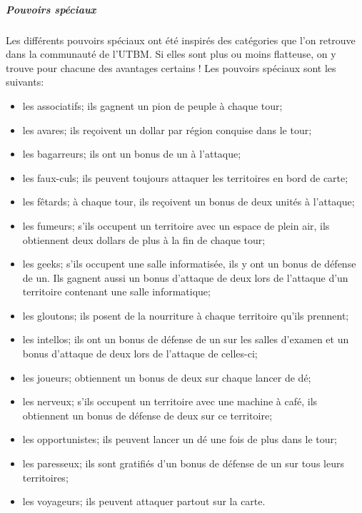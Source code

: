 \documentclass[a4paper, 11pt]{article}
\begin{document}
		\subparagraph{Pouvoirs spéciaux}
		Les différents pouvoirs spéciaux ont été inspirés des catégories que l'on retrouve dans la communauté de l'UTBM. Si elles sont plus ou moins flatteuse, on y trouve pour chacune des avantages certains ! Les pouvoirs spéciaux sont les suivants:
		\begin{itemize}
			\item les associatifs; ils gagnent un pion de peuple à chaque tour;
			\item les avares; ils reçoivent un dollar par région conquise dans le tour;
			\item les bagarreurs; ils ont un bonus de un à l'attaque;
			\item les faux-culs; ils peuvent toujours attaquer les territoires en bord de carte;
			\item les fêtards; à chaque tour, ils reçoivent un bonus de deux unités à l'attaque;
			\item les fumeurs; s'ils occupent un territoire avec un espace de plein air, ils obtiennent deux dollars de plus à la fin de chaque tour;
			\item les geeks; s'ils occupent une salle informatisée, ils y ont un bonus de défense de un. Ils gagnent aussi un bonus d'attaque de deux lors de l'attaque d'un territoire contenant une salle informatique;
			\item les gloutons; ils posent de la nourriture à chaque territoire qu'ils prennent;
			\item les intellos; ils ont un bonus de défense de un sur les salles d'examen et un bonus d'attaque de deux lors de l'attaque de celles-ci;
			\item les joueurs; obtiennent un bonus de deux sur chaque lancer de dé;
			\item les nerveux; s'ils occupent un territoire avec une machine à café, ils obtiennent un bonus de défense de deux sur ce territoire;
			\item les opportunistes; ils peuvent lancer un dé une fois de plus dans le tour;
			\item les paresseux; ils sont gratifiés d'un bonus de défense de un sur tous leurs territoires;
			\item les voyageurs; ils peuvent attaquer partout sur la carte.
		\end{itemize}
		
\end{document}
